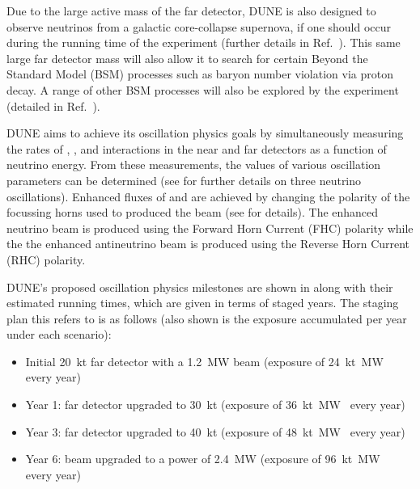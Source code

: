Due to the large active mass of the far detector, DUNE is also designed to observe neutrinos from a galactic core-collapse supernova, if one should occur during the running time of the experiment (further details in Ref.~\cite{duneSupernova}).
This same large far detector mass will also allow it to search for certain Beyond the Standard Model (BSM) processes such as baryon number violation via proton decay.
A range of other BSM processes will also be explored by the experiment (detailed in Ref.~\cite{duneBSM}).

DUNE aims to achieve its oscillation physics goals by simultaneously measuring the rates of \numu, \anumu, \nue and \anue interactions in the near and far detectors as a function of neutrino energy.
From these measurements, the values of various oscillation parameters can be determined (see  for further details on three neutrino oscillations). 
Enhanced fluxes of \anumu and \anue are achieved by changing the polarity of the focussing horns used to produced the beam (see  for details).
The enhanced neutrino beam is produced using the Forward Horn Current (FHC) polarity while the the enhanced antineutrino beam is produced using the Reverse Horn Current (RHC) polarity.

DUNE's proposed oscillation physics milestones are shown in  along with their estimated running times, which are given in terms of staged years. 
The staging plan this refers to is as follows (also shown is the exposure accumulated per year under each scenario):
\begin{itemize}
	\item Initial \SI{20}{\kilo\tonne} far detector with a \SI{1.2}{\mega\watt} beam (exposure of \SI{24}{\kilo\tonne\mega\watt\year} every year)
	\item Year 1: far detector upgraded to \SI{30}{\kilo\tonne} (exposure of \SI{36}{\kilo\tonne\mega\watt\year} every year)
	\item Year 3: far detector upgraded to \SI{40}{\kilo\tonne} (exposure of \SI{48}{\kilo\tonne\mega\watt\year} every year)
	\item Year 6: beam upgraded to a power of \SI{2.4}{\mega\watt} (exposure of \SI{96}{\kilo\tonne\mega\watt\year} every year)
\end{itemize}

